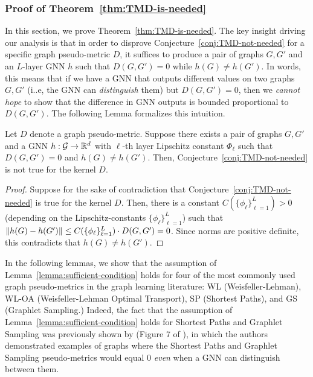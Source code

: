 \subsubsection{Proof of Theorem~\ref{thm:TMD-is-needed}}\label{sec:thm-tmd-is-needed}

In this section, we prove Theorem~\ref{thm:TMD-is-needed}. The key insight driving our analysis is that in order to disprove Conjecture~\ref{conj:TMD-not-needed} for a specific graph pseudo-metric $D$, it suffices to produce a pair of graphs $G, G'$ and an $L$-layer GNN $h$ such that $D(G, G') = 0$ while $h(G) \neq h(G')$. In words, this means that if we have a GNN that outputs different values on two graphs $G, G'$ (i..e, the GNN can \emph{distinguish} them) but $D(G, G') = 0$, then we \emph{cannot hope} to show that the difference in GNN outputs is bounded proportional to $D(G, G')$.
The following Lemma formalizes this intuition.

\begin{lemma}\label{lemma:sufficient-condition} Let $D$ denote a graph pseudo-metric. Suppose there exists a pair of graphs $G, G'$ and a GNN  $h: \mathcal G \to \mathbb R^d$ with $\ell$-th layer Lipschitz constant $\Phi_\ell$ such that $D(G, G') = 0$ and $h(G) \neq h(G')$. Then, Conjecture~\ref{conj:TMD-not-needed} is not true for the kernel $D$. 
\end{lemma}
\begin{proof} Suppose for the sake of contradiction that Conjecture~\ref{conj:TMD-not-needed} is true for the kernel $D$. Then, there is a constant $C(\{\phi_\ell\}_{\ell=1}^{L}) > 0$ (depending on the Lipschitz-constants $\{\phi_\ell\}_{\ell=1}^{L}$) such that $\left\lVert h(G) - h(G')\right\rVert \leq C(\{\phi_\ell\}_{\ell=1}^{L}) \cdot D(G, G') = 0$. Since norms are positive definite, this contradicts that $h(G) \neq h(G')$. 
\end{proof}

In the following lemmas, we show that the assumption of Lemma~\ref{lemma:sufficient-condition} holds for four of the most commonly used graph pseudo-metrics in the graph learning literature: WL (Weisfeller-Lehman), WL-OA (Weisfeller-Lehman Optimal Transport), SP (Shortest Paths), and GS (Graphlet Sampling.) Indeed, the fact that the assumption of Lemma~\ref{lemma:sufficient-condition} holds for Shortest Paths and Graphlet Sampling was previously shown by \citet{kriege2020survey} (Figure 7 of \citet{kriege2020survey}), in which the authors demonstrated examples of graphs where the Shortest Paths and Graphlet Sampling pseudo-metrics would equal 0 \emph{even} when a GNN can distinguish between them. 

